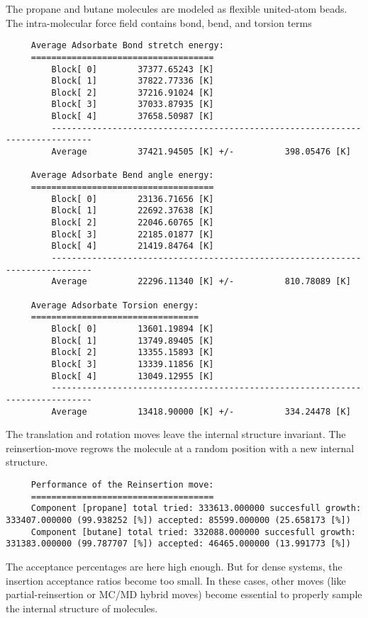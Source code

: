 The propane and butane molecules are modeled as flexible united-atom beads.
The intra-molecular force field contains bond, bend, and torsion terms
\begin{tiny}
\begin{verbatim}
     Average Adsorbate Bond stretch energy:
     ====================================
         Block[ 0]        37377.65243 [K]
         Block[ 1]        37822.77336 [K]
         Block[ 2]        37216.91024 [K]
         Block[ 3]        37033.87935 [K]
         Block[ 4]        37658.50987 [K]
         ------------------------------------------------------------------------------
         Average          37421.94505 [K] +/-          398.05476 [K]

     Average Adsorbate Bend angle energy:
     ====================================
         Block[ 0]        23136.71656 [K]
         Block[ 1]        22692.37638 [K]
         Block[ 2]        22046.60765 [K]
         Block[ 3]        22185.01877 [K]
         Block[ 4]        21419.84764 [K]
         ------------------------------------------------------------------------------
         Average          22296.11340 [K] +/-          810.78089 [K]

     Average Adsorbate Torsion energy:
     =================================
         Block[ 0]        13601.19894 [K]
         Block[ 1]        13749.89405 [K]
         Block[ 2]        13355.15893 [K]
         Block[ 3]        13339.11856 [K]
         Block[ 4]        13049.12955 [K]
         ------------------------------------------------------------------------------
         Average          13418.90000 [K] +/-          334.24478 [K]
\end{verbatim}
\end{tiny}
The translation and rotation moves leave the internal structure invariant.
The reinsertion-move regrows the molecule at a random position with a new internal structure.
\begin{tiny}
\begin{verbatim}
     Performance of the Reinsertion move:
     ====================================
     Component [propane] total tried: 333613.000000 succesfull growth: 333407.000000 (99.938252 [%]) accepted: 85599.000000 (25.658173 [%])
     Component [butane] total tried: 332088.000000 succesfull growth: 331383.000000 (99.787707 [%]) accepted: 46465.000000 (13.991773 [%])
\end{verbatim}
\end{tiny}
The acceptance percentages are here high enough. But for dense systems, the insertion acceptance ratios become too small.
In these cases, other moves (like partial-reinsertion or MC/MD hybrid moves) become essential to properly sample the internal structure of molecules.

